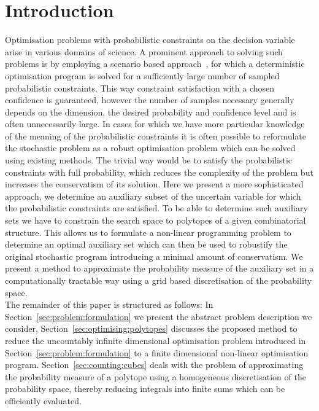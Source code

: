 \documentclass[letterpaper, 10pt, conference]{ieeeconf} %
\begin{document}
\section{Introduction}\label{sec:intro}%
%
%
%
%
%
\noindent Optimisation problems with probabilistic constraints on the decision variable arise in various domains of science.
%
A prominent approach to solving such problems is by employing a scenario based approach~\cite{Calafiore:2010}, for which a deterministic optimisation program is solved for a sufficiently large number of sampled probabilistic constraints.
%
This way constraint satisfaction with a chosen confidence is guaranteed, however the number of samples necessary generally depends on the dimension, the desired probability and confidence level and is often unnecessarily large.
%
In cases for which we have more particular knowledge of the meaning of the probabilistic constraints it is often possible to reformulate the stochastic problem as a robust optimisation problem which can be solved using existing methods.
%
The trivial way would be to satisfy the probabilistic constraints with full probability, which reduces the complexity of the problem but increases the conservatism of its solution.
%
Here we present a more sophisticated approach, we determine an auxiliary subset of the uncertain variable for which the probabilistic constraints are satisfied.
%
To be able to determine such auxiliary sets we have to constrain the search space to polytopes of a given combinatorial structure.
%
This allows us to formulate a non-linear programming problem to determine an optimal auxiliary set which can then be used to robustify the original stochastic program introducing a minimal amount of conservatism.
%
We present a method to approximate the probability measure of the auxiliary set in a computationally tractable way using a grid based discretisation of the probability space.
%
\\[1em]
%
The remainder of this paper is structured as follows:
%
In Section~\ref{sec:problem:formulation} we present the abstract problem description we consider, Section~\ref{sec:optimising:polytopes} discusses the proposed method to reduce the uncountably infinite dimensional optimisation problem introduced in Section~\ref{sec:problem:formulation} to a finite dimensional non-linear optimisation program.
%
Section~\ref{sec:counting:cubes} deals with the problem of approximating the probability measure of a polytope using a homogeneous discretisation of the probability space, thereby reducing integrals into finite sums which can be efficiently evaluated.
\end{document}
